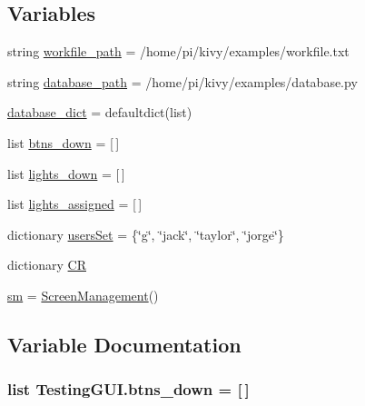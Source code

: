 \subsection*{Variables}
\begin{DoxyCompactItemize}
\item 
string \hyperlink{namespaceTestingGUI_a11c4b70f772a0a449cd7b0dabf533848}{workfile\+\_\+path} = \textquotesingle{}/home/pi/kivy/examples/workfile.\+txt\textquotesingle{}
\item 
string \hyperlink{namespaceTestingGUI_a35e81274fb7bccca150736fa44146910}{database\+\_\+path} = \textquotesingle{}/home/pi/kivy/examples/database.\+py\textquotesingle{}
\item 
\hyperlink{namespaceTestingGUI_a5a1fe398b7a7e172a18aa44b2c1793f4}{database\+\_\+dict} = defaultdict(list)
\item 
list \hyperlink{namespaceTestingGUI_a392f51b5b3ce353bf9d3f49958c05d89}{btns\+\_\+down} = \mbox{[}$\,$\mbox{]}
\item 
list \hyperlink{namespaceTestingGUI_ac086b5927511e0e2b06690ab3b412797}{lights\+\_\+down} = \mbox{[}$\,$\mbox{]}
\item 
list \hyperlink{namespaceTestingGUI_afbf31e993bfc6222d8d8bea7122e93a5}{lights\+\_\+assigned} = \mbox{[}$\,$\mbox{]}
\item 
dictionary \hyperlink{namespaceTestingGUI_a4a1b5baf3d7390a99be46eacbe5c323f}{users\+Set} = \{\char`\"{}g\char`\"{}, \char`\"{}jack\char`\"{}, \char`\"{}taylor\char`\"{}, \char`\"{}jorge\char`\"{}\}
\item 
dictionary \hyperlink{namespaceTestingGUI_af38d10d3b8204ffbe61a4ec28c035776}{CR}
\item 
\hyperlink{namespaceTestingGUI_a09440ec859deb60fe3147a2ae81bf30c}{sm} = \hyperlink{classTestingGUI_1_1ScreenManagement}{Screen\+Management}()
\end{DoxyCompactItemize}


\subsection{Variable Documentation}
\subsubsection[{\texorpdfstring{btns\+\_\+down}{btns_down}}]{\setlength{\rightskip}{0pt plus 5cm}list Testing\+G\+U\+I.\+btns\+\_\+down = \mbox{[}$\,$\mbox{]}}\hypertarget{namespaceTestingGUI_a392f51b5b3ce353bf9d3f49958c05d89}{}\label{namespaceTestingGUI_a392f51b5b3ce353bf9d3f49958c05d89}
